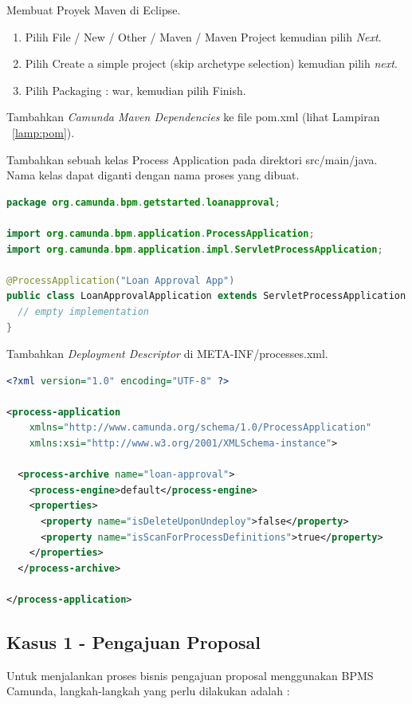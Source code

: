 \begin{description}
	\item Membuat Proyek Maven di Eclipse. 
		\begin{enumerate}
			\item Pilih File / New / Other / Maven / Maven Project kemudian pilih \textit{Next}.
			\item Pilih Create a simple project (skip archetype selection) kemudian pilih \textit{next}.
			\item Pilih Packaging : war, kemudian pilih Finish.
		\end{enumerate}
	\item Tambahkan \textit{Camunda Maven Dependencies} ke file pom.xml (lihat Lampiran ~\ref{lamp:pom}).
	\item Tambahkan sebuah kelas Process Application pada direktori src/main/java. Nama kelas dapat diganti dengan nama proses yang dibuat. 
	\begin{lstlisting}[language=java,basicstyle=\tiny,caption=Kelas Process Application]
	package org.camunda.bpm.getstarted.loanapproval;

import org.camunda.bpm.application.ProcessApplication;
import org.camunda.bpm.application.impl.ServletProcessApplication;

@ProcessApplication("Loan Approval App")
public class LoanApprovalApplication extends ServletProcessApplication {
  // empty implementation
}
	\end{lstlisting}
	\item Tambahkan \textit{Deployment Descriptor} di META-INF/processes.xml.
	
	\begin{lstlisting}[language=xml,basicstyle=\tiny,caption=processes.xml]	
	<?xml version="1.0" encoding="UTF-8" ?>

<process-application
    xmlns="http://www.camunda.org/schema/1.0/ProcessApplication"
    xmlns:xsi="http://www.w3.org/2001/XMLSchema-instance">

  <process-archive name="loan-approval">
    <process-engine>default</process-engine>
    <properties>
      <property name="isDeleteUponUndeploy">false</property>
      <property name="isScanForProcessDefinitions">true</property>
    </properties>
  </process-archive>

</process-application>
	\end{lstlisting}
	
	
\end{description}

\subsection{Kasus 1 - Pengajuan Proposal}
\label{hasilstudi_bpms_kasus1}
Untuk menjalankan proses bisnis pengajuan proposal menggunakan BPMS Camunda, langkah-langkah yang perlu dilakukan adalah :

